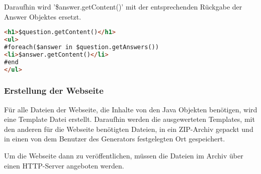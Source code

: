 Daraufhin wird '\$answer.getContent()' mit der entsprechenden Rückgabe der Answer Objektes ersetzt.


\begin{lstlisting}[basicstyle=\tiny,label={lst:velocity-example},caption={Beispiel eines Velocity Templates.},language=HTML]
<h1>$question.getContent()</h1>
<ul>
#foreach($answer in $question.getAnswers())
<li>$answer.getContent()</li>
#end
</ul>
\end{lstlisting}

\subsubsection{Erstellung der Webseite}
Für alle Dateien der Webseite, die Inhalte von den Java Objekten benötigen, wird eine Template Datei erstellt.
Daraufhin werden die ausgewerteten Templates, mit den anderen für die Webseite benötigten Dateien, in ein ZIP-Archiv gepackt und in einen von dem Benutzer des Generators festgelegten Ort gespeichert.

Um die Webseite dann zu veröffentlichen, müssen die Dateien im Archiv über einen HTTP-Server angeboten werden.


